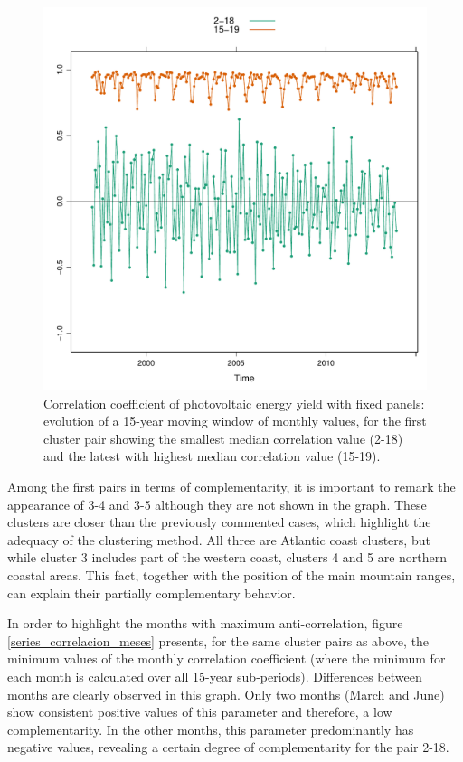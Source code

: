 \begin{figure}[h!]
\includegraphics[scale=0.6]{figs/capitulo5/figure8.pdf}
\caption[Correlation coefficients of the yearly energy yield for the two pairs of clusters with the highest and smallest correlation values over the Iberian Peninsula]{Correlation coefficient of photovoltaic energy yield with fixed panels: evolution of a 15-year moving window of monthly values, for the first cluster pair showing the smallest median correlation value (2-18) and the latest with highest median correlation value (15-19).}
\label{series_correlacion}
\end{figure}

Among the first pairs in terms of complementarity, it is important to remark the appearance of 3-4 and 3-5 although they are not shown in the graph. These clusters are closer than the previously commented cases, which highlight the adequacy of the clustering method. All three are Atlantic coast clusters, but while cluster 3 includes part of the western coast, clusters 4 and 5 are northern coastal areas. This fact, together with the position of the main mountain ranges, can explain their partially complementary behavior.

In order to highlight the months with maximum anti-correlation, figure \ref{series_correlacion_meses} presents, for the same cluster pairs as above, the minimum values of the monthly correlation coefficient (where the minimum for each month is calculated over all 15-year sub-periods). Differences between months are clearly observed in this graph. Only two months (March and June) show consistent positive values of this parameter and therefore, a low complementarity. In the other months, this parameter predominantly has negative values, revealing a certain degree of complementarity for the pair 2-18.


